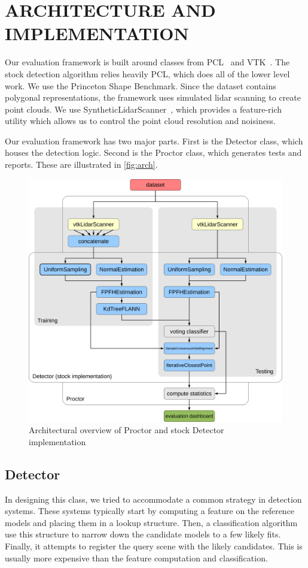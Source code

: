 \section{ARCHITECTURE AND IMPLEMENTATION}
Our evaluation framework is built around classes from PCL~\cite{PCL} and VTK~\cite{vtk}.
The stock detection algorithm relies heavily PCL, which does all of the lower level work.
We use the Princeton Shape Benchmark.
Since the dataset contains polygonal representations, the framework uses simulated lidar scanning to create point clouds. We use SyntheticLidarScanner~\cite{Doria2009}, which provides a feature-rich utility which allows us to control the point cloud resolution and noisiness.

Our evaluation framework has two major parts. First is the Detector class, which houses the detection logic. Second is the Proctor class, which generates tests and reports. These are illustrated in \autoref{fig:arch}.

\begin{figure}[thpb]
  \centering
  \includegraphics[width=\columnwidth]{../figures/architecture.pdf}
  \caption{Architectural overview of Proctor and stock Detector implementation}
  \label{fig:arch}
\end{figure}

\subsection{Detector}
In designing this class, we tried to accommodate a common strategy in detection systems.
These systems typically start by computing a feature on the reference models and placing them in a lookup structure.
Then, a classification algorithm use this structure to narrow down the candidate models to a few likely fits.
Finally, it attempts to register the query scene with the likely candidates. This is usually more expensive than the feature computation and classification.

